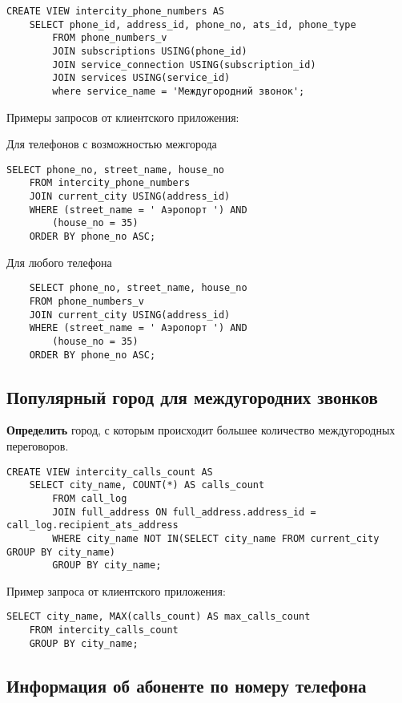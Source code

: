 \documentclass{report}
\begin{document}
\begin{lstlisting}
CREATE VIEW intercity_phone_numbers AS
    SELECT phone_id, address_id, phone_no, ats_id, phone_type
        FROM phone_numbers_v
        JOIN subscriptions USING(phone_id)
        JOIN service_connection USING(subscription_id)
        JOIN services USING(service_id)
        where service_name = 'Междугородний звонок';
\end{lstlisting}

Примеры запросов от клиентского приложения:

Для телефонов с возможностью межгорода
\begin{lstlisting}
SELECT phone_no, street_name, house_no
	FROM intercity_phone_numbers
	JOIN current_city USING(address_id)
	WHERE (street_name = ' Аэропорт ') AND
		(house_no = 35)
	ORDER BY phone_no ASC;
\end{lstlisting}

Для любого телефона
\begin{lstlisting}
    SELECT phone_no, street_name, house_no
	FROM phone_numbers_v
	JOIN current_city USING(address_id)
	WHERE (street_name = ' Аэропорт ') AND
		(house_no = 35)
	ORDER BY phone_no ASC;
\end{lstlisting}

\subsection{Популярный город для междугородних звонков}

\textbf{Определить} город, с которым происходит большее количество 
междугородных переговоров.

\begin{lstlisting}
CREATE VIEW intercity_calls_count AS
    SELECT city_name, COUNT(*) AS calls_count 
        FROM call_log 
        JOIN full_address ON full_address.address_id = call_log.recipient_ats_address
        WHERE city_name NOT IN(SELECT city_name FROM current_city GROUP BY city_name)
        GROUP BY city_name;
\end{lstlisting}

Пример запроса от клиентского приложения:

\begin{lstlisting}
SELECT city_name, MAX(calls_count) AS max_calls_count
	FROM intercity_calls_count
	GROUP BY city_name;
\end{lstlisting}

\subsection{Информация об абоненте по номеру телефона}
\end{document}

